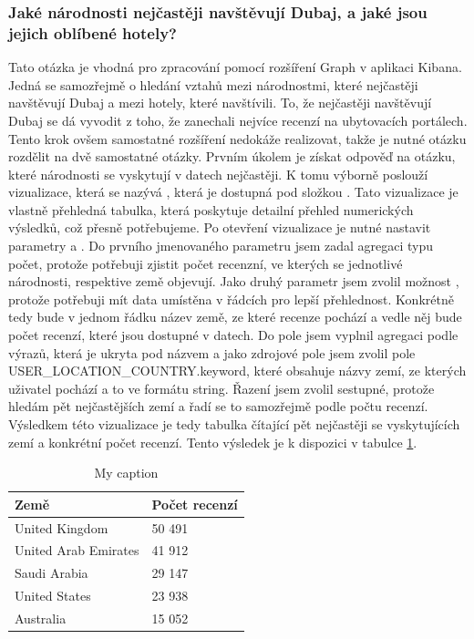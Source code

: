 \documentclass[czech,BP]{thesiskiv}
\begin{document}
\subsubsection{Jaké národnosti nejčastěji navštěvují Dubaj, a jaké jsou jejich oblíbené hotely?}
\label{subsub:Národnosti}
Tato otázka je vhodná pro zpracování pomocí rozšíření Graph v aplikaci Kibana. Jedná se samozřejmě o hledání vztahů mezi národnostmi, které nejčastěji navštěvují Dubaj a mezi hotely, které navštívili. To, že nejčastěji navštěvují Dubaj se dá vyvodit z toho, že zanechali nejvíce recenzí na ubytovacích portálech. Tento krok ovšem samostatné rozšíření nedokáže realizovat, takže je nutné otázku rozdělit na dvě samostatné otázky.
Prvním úkolem je získat odpověď na otázku, které národnosti se vyskytují v datech nejčastěji. K tomu výborně poslouží vizualizace, která se nazývá , která je dostupná pod složkou . Tato vizualizace je vlastně přehledná tabulka, která poskytuje detailní přehled numerických výsledků, což přesně potřebujeme. Po otevření vizualizace je nutné nastavit parametry  a . Do prvního jmenovaného parametru jsem zadal agregaci typu počet, protože potřebuji zjistit počet recenzní, ve kterých se jednotlivé národnosti, respektive země objevují. Jako druhý parametr jsem zvolil možnost , protože potřebuji mít data umístěna v řádcích pro lepší přehlednost. Konkrétně tedy bude v jednom řádku název země, ze které recenze pochází a vedle něj bude počet recenzí, které jsou dostupné v datech. Do pole  jsem vyplnil agregaci podle výrazů, která je ukryta pod názvem  a jako zdrojové pole jsem zvolil pole USER\_LOCATION\_COUNTRY.keyword, které obsahuje názvy zemí, ze kterých uživatel pochází a to ve formátu string. Řazení jsem zvolil sestupné, protože hledám pět nejčastějších zemí a řadí se to samozřejmě podle počtu recenzí. Výsledkem této vizualizace je tedy tabulka čítající pět nejčastěji se vyskytujících zemí a konkrétní počet recenzí. Tento výsledek je k dispozici v tabulce \ref{Pocet_zeme}.
\begin{table}[]
	\centering
	\begin{tabular}{|l|l|}
		\hline
		\textbf{Země}        & \textbf{Počet recenzí} \\ \hline
		United Kingdom       & 50 491                 \\ \hline
		United Arab Emirates & 41 912                 \\ \hline
		Saudi Arabia         & 29 147                 \\ \hline
		United States        & 23 938                 \\ \hline
		Australia            & 15 052                 \\ \hline
	\end{tabular}
	\caption{My caption}
	\label{Pocet_zeme}
\end{table}
\end{document}
